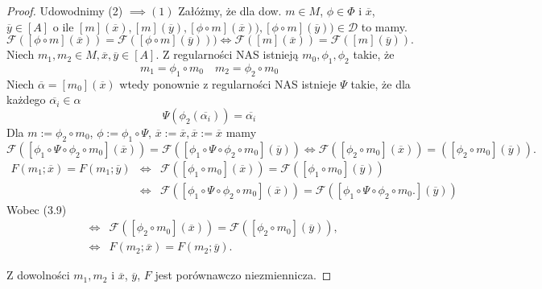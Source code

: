 \documentclass[12pt,a4paper]{report}
\newcommand{\domkniecie}[1]{\left[ {#1} \right] }
\begin{document}
\begin{proof}
Udowodnimy (2) $\implies (1)$
Załóżmy, że dla dow. $m \in M$, $\phi \in \Phi$ i $\overline{x}$, $\overline{y} \in \domkniecie{A}$ o ile $\domkniecie{m}(\overline{x}), \domkniecie{
m}(\overline{y}), \domkniecie{\phi\circ m}(\overline{x})), \domkniecie{\phi\circ m}(\overline{y})) \in \mathcal{D}$ to mamy.
\begin{equation}
\mathcal{F}(\domkniecie{\phi \circ m}(\overline{x}))=\mathcal{F}(\domkniecie{\phi \circ m}(\overline{y}))) \iff \mathcal{F}(\domkniecie{m}(\overline{x}))=\mathcal{F}(\domkniecie{m}(\overline{y})).
\end{equation}
Niech $m_1,m_2 \in M, \overline{x}, \overline{y} \in \domkniecie{A}$. Z regularności NAS istnieją $m_0, \phi_1,\phi_2$ takie, że
$$ 
m_1=\phi_1\circ m_0 \quad m_2=\phi_2\circ m_0
$$
Niech $\overline{\alpha}=\domkniecie{m_0}(\overline{x})$ wtedy ponownie z regularności NAS istnieje $\Psi$ takie, że dla każdego $\overline{\alpha_i} \in \alpha$
$$
\Psi(\phi_2(\overline{\alpha_i}))=\overline{\alpha_i}
$$
Dla $m:=\phi_2 \circ m_0$, $\phi:=\phi_1\circ \Psi$, $\overline{x}:=\overline{x}, \overline{x}:=\overline{x}$ mamy 
$$
\mathcal{F}(\domkniecie{\phi_1\circ \Psi \circ \phi_2\circ m_0}(\overline{x}))=\mathcal{F}(\domkniecie{\phi_1\circ \Psi \circ \phi_2\circ m_0}(\overline{y})) \iff \mathcal{F}(\domkniecie{\phi_2\circ m_0}(\overline{x}))=(\domkniecie{\phi_2\circ m_0}(\overline{y})).
$$
\begin{eqnarray*}
F(m_1;\overline{x})=F(m_1;\overline{y}) & \iff  & \mathcal{F}(\domkniecie{\phi_1\circ m_0}(\overline{x}))=\mathcal{F}(\domkniecie{\phi_1 \circ m_0}(\overline{y}))\\
&  \iff & \mathcal{F}(\domkniecie{\phi_1\circ\Psi\circ\phi_2\circ m_0}(\overline{x}))=\mathcal{F}(\domkniecie{\phi_1\circ\Psi\circ\phi_2\circ m_0.}(\overline{y})) 
\end{eqnarray*}
Wobec (3.9)
\begin{eqnarray*}
& \iff & \mathcal{F}(\domkniecie{\phi_2\circ m_0}(\overline{x}))=\mathcal{F}(\domkniecie{\phi_2\circ m_0}(\overline{y})),\\
& \iff & F(m_2;\overline{x})=F(m_2;\overline{y}).
\end{eqnarray*}

Z dowolności $m_1, m_2$ i $\overline{x}$, $\overline{y}$, $F$ jest porównawczo niezmiennicza.


\end{proof}
\end{document}

